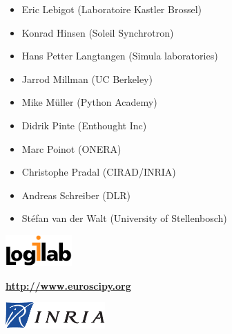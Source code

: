 \documentclass[slidestop,11pt,compress,serif]{beamer} %
\newcommand{\vfillll}{\vfilll\vfilll\vfilll\vfilll\vfilll\vfilll\vfilll\vfilll\vfilll\vfilll\vfilll\vfilll\vfilll\vfilll\vfilll\vfilll\vfilll\vfilll\vfilll\vfilll\vfilll\vfilll\vfilll\vfilll\vfilll\vfilll\vfilll\vfilll\vfilll\vfilll\vfilll\vfilll\vfilll\vfilll\vfilll\vfilll\vfilll\vfilll\vfilll\vfilll}
\newcommand{\mydot}{\hspace*{-0.3ex}%
\raisebox{0.2ex}{\color{structurecolor}\rule{1.1ex}{1.1ex}}%
\hspace*{0.4ex}%
}
\begin{document}
\begin{frame}[plain,t]
\begin{minipage}{.79\linewidth}
\begin{minipage}[t]{0.49\linewidth}
{\begin{itemize}
\item[\mydot] Eric Lebigot {\small (Laboratoire Kastler Brossel)}
             
\item[\mydot] Konrad Hinsen {\small (Soleil Synchrotron)}
             
\item[\mydot] Hans Petter Langtangen {\small (Simula laboratories)}

\item[\mydot] Jarrod Millman {\small (UC Berkeley)}
             
\item[\mydot] Mike Müller {\small (Python Academy)}
             
\item[\mydot] Didrik Pinte {\small (Enthought Inc)}

\item[\mydot] Marc Poinot {\small (ONERA)}
             
\item[\mydot] Christophe Pradal {\small (CIRAD/INRIA)}
             
\item[\mydot] Andreas Schreiber {\small (DLR)}

\item[\mydot] Stéfan van der Walt {\small (University of Stellenbosch)}
    \end{itemize}
}%
\end{minipage}

\end{minipage}

\vfillll%


\begin{minipage}{.25\linewidth}
    \includegraphics[height=1.2cm]{logilab}
\end{minipage}
\hfill
\begin{minipage}{.4\linewidth}
    \centerline{\bfseries\textcolor{structurecolor}{\huge
			\url{http://www.euroscipy.org}}}
\end{minipage}
\hfill
\begin{minipage}{.25\linewidth}
    \hfill\includegraphics[height=1cm]{logo_inria_simple}%
\end{minipage}

\vskip 1cm
\vfill\vbox{}%


\end{frame}
\end{document}
